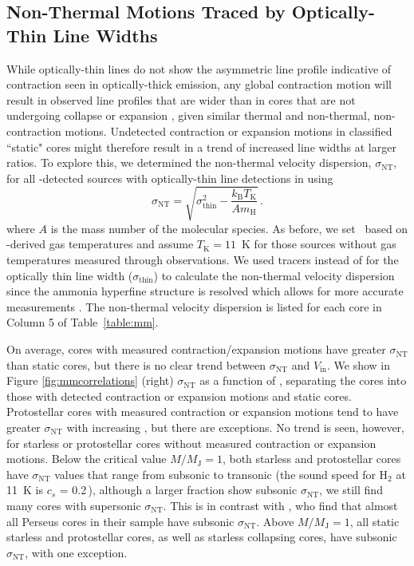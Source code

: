 \documentclass[iop,twocolappendix]{emulateapj}
\begin{document}
\subsection{Non-Thermal Motions Traced by Optically-Thin Line Widths}
\label{sec:widths}

While optically-thin lines do not show the asymmetric line profile indicative of contraction seen in optically-thick emission, any global contraction motion will result in observed line profiles that are wider than in cores that are not undergoing collapse or expansion \citep{myers05}, given similar thermal and non-thermal, non-contraction motions. Undetected contraction or expansion motions in classified ``static" cores might therefore result in a trend of increased line widths at larger {\MMJ} ratios.  To explore this, we determined the non-thermal velocity dispersion, $\sigma_\mathrm{NT}$, for all \HCO-detected sources with optically-thin {\ammonia} line detections in \citet{Rosolowsky2008} using
%
\begin{equation}
\label{eq:dispersion}
{\sigma}_\mathrm{NT} = \sqrt{{\sigma}_\mathrm{thin}^2 - \frac{k_\mathrm{B} T_\mathrm{K}}{A m_\mathrm{H}} }  \, .
\end{equation}
%
where $A$ is the mass number of the molecular species. As before, we set \tk\ based on \ammonia-derived gas temperatures and assume $T_\mathrm{K} = 11$~K for those sources without gas temperatures measured through {\ammonia} observations. We used {\ammonia} tracers instead of {\NtD} for the optically thin line width (${\sigma}_\mathrm{thin}$) to calculate the non-thermal velocity dispersion since the ammonia hyperfine structure is resolved which allows for more accurate measurements \citep{Rosolowsky2008}. The non-thermal velocity dispersion is listed for each core in Column 5 of Table~\ref{table:mm}. 

On average, cores with measured contraction/expansion motions have greater $\sigma_\mathrm{NT}$ than static cores, but there is no clear trend between $\sigma_\mathrm{NT}$ and $V_\mathrm{in}$. We show in Figure \ref{fig:mmcorrelations} (right) $\sigma_\mathrm{NT}$ as a function of \MMJ, separating the cores into those with detected contraction or expansion motions and static cores. Protostellar cores with measured contraction or expansion motions tend to have greater $\sigma_\mathrm{NT}$ with increasing \MMJ, but there are exceptions. No trend is seen, however, for starless or protostellar cores without measured contraction or expansion motions. Below the critical value $M/M_\mathrm{J} = 1$, both starless and protostellar cores have $\sigma_\mathrm{NT}$ values that range from subsonic to transonic (the sound speed for H$_2$ at 11~K is $c_s$ = 0.2\,\kms), although a larger fraction show subsonic $\sigma_\mathrm{NT}$, we still find many cores with supersonic $\sigma_\mathrm{NT}$. This is in contrast with \citet{Foster2009}, who find that almost all Perseus cores in their sample have subsonic $\sigma_\mathrm{NT}$. Above $M/M_\mathrm{J} = 1$, all static starless and protostellar cores, as well as starless collapsing cores, have subsonic $\sigma_\mathrm{NT}$, with one exception. 
\end{document}
